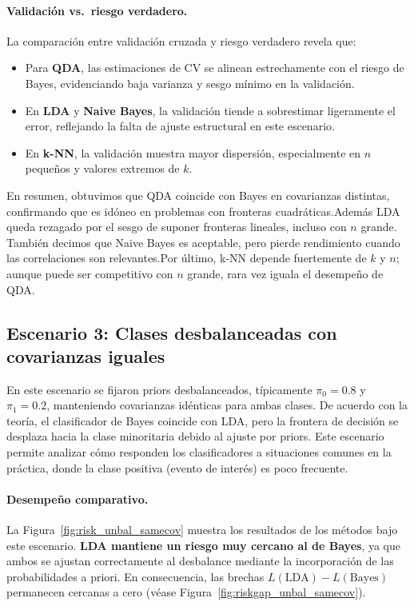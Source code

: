 \documentclass[10pt]{article}
\begin{document}
\paragraph{Validación vs.\ riesgo verdadero.}
La comparación entre validación cruzada y riesgo verdadero revela que:
\begin{itemize}
    \item Para \textbf{QDA}, las estimaciones de CV se alinean estrechamente con el riesgo de Bayes, evidenciando baja varianza y sesgo mínimo en la validación.
    \item En \textbf{LDA} y \textbf{Naive Bayes}, la validación tiende a sobrestimar ligeramente el error, reflejando la falta de ajuste estructural en este escenario.
    \item En \textbf{k-NN}, la validación muestra mayor dispersión, especialmente en $n$ pequeños y valores extremos de $k$.
\end{itemize}

En resumen, obtuvimos que QDA coincide con Bayes en covarianzas distintas, confirmando que es idóneo en problemas con fronteras cuadráticas.Además LDA queda rezagado por el sesgo de suponer fronteras lineales, incluso con $n$ grande. También decimos que Naive Bayes es aceptable, pero pierde rendimiento cuando las correlaciones son relevantes.Por último, k-NN depende fuertemente de $k$ y $n$; aunque puede ser competitivo con $n$ grande, rara vez iguala el desempeño de QDA.


\subsection*{Escenario 3: Clases desbalanceadas con covarianzas iguales}

En este escenario se fijaron priors desbalanceados, típicamente $\pi_0=0.8$ y $\pi_1=0.2$, manteniendo covarianzas idénticas para ambas clases. 
De acuerdo con la teoría, el clasificador de Bayes coincide con LDA, pero la frontera de decisión se desplaza hacia la clase minoritaria debido al ajuste por priors. 
Este escenario permite analizar cómo responden los clasificadores a situaciones comunes en la práctica, donde la clase positiva (evento de interés) es poco frecuente.

\paragraph{Desempeño comparativo.}
La Figura~\ref{fig:risk_unbal_samecov} muestra los resultados de los métodos bajo este escenario. 
\textbf{LDA mantiene un riesgo muy cercano al de Bayes}, ya que ambos se ajustan correctamente al desbalance mediante la incorporación de las probabilidades a priori. 
En consecuencia, las brechas $L(\text{LDA})-L(\text{Bayes})$ permanecen cercanas a cero (véase Figura~\ref{fig:riskgap_unbal_samecov}).
\end{document}
